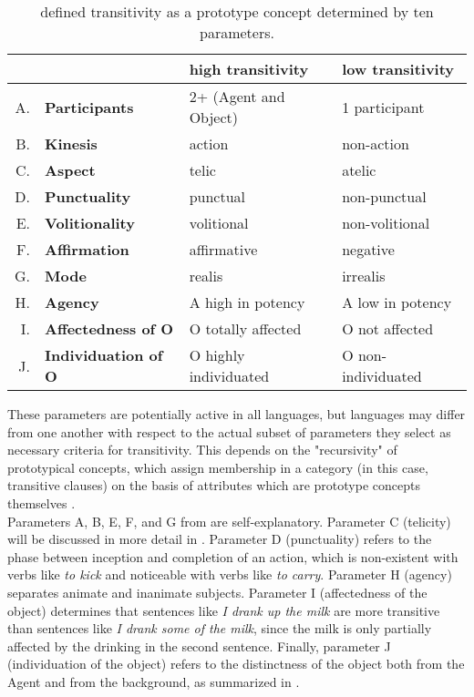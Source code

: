 \begin{table}[htb] %
\caption{\textcite[252]{HopperThompson1980} defined transitivity as a prototype concept determined by ten parameters.}
\begin{tabular}{rl|ll}
 & & \textbf{high transitivity} & \textbf{low transitivity} \\
 \hline
A. & \textbf{Participants} & 2+ (Agent and Object)  & 1 participant  \\
B. & \textbf{Kinesis} & action  & non-action  \\
C. & \textbf{Aspect} & telic  & atelic  \\
D. & \textbf{Punctuality} & punctual  & non-punctual  \\
E. & \textbf{Volitionality} & volitional  & non-volitional  \\
F. & \textbf{Affirmation} & affirmative  & negative  \\
G. & \textbf{Mode} & realis  & irrealis  \\
H. & \textbf{Agency} & A high in potency  & A low in potency   \\
I. & \textbf{Affectedness of O} & O totally affected  & O not affected  \\
J. & \textbf{Individuation of O} & O highly individuated  & O non-individuated  
\end{tabular}
\end{table}

These parameters are potentially active in all languages, but languages may differ from one another with respect to the actual subset of parameters they select as necessary criteria for transitivity. This depends on the "recursivity" \parencite[29]{Naess2007} of prototypical concepts, which assign membership in a category (in this case, transitive clauses) on the basis of attributes which are prototype concepts themselves \parencite[61]{taylor1995linguistic}.\\
Parameters A, B, E, F, and G from  are self-explanatory. Parameter C (telicity) will be discussed in more detail in . Parameter D (punctuality) refers to the phase between inception and completion of an action, which is non-existent with verbs like \textit{to kick} and noticeable with verbs like \textit{to carry}. Parameter H (agency) separates animate and inanimate subjects. Parameter I (affectedness of the object) determines that sentences like \textit{I drank up the milk} are more transitive than sentences like \textit{I drank some of the milk}, since the milk is only partially affected by the drinking in the second sentence. Finally, parameter J (individuation of the object) refers to the distinctness of the object both from the Agent and from the background, as summarized in  \parencite[253]{HopperThompson1980}.

